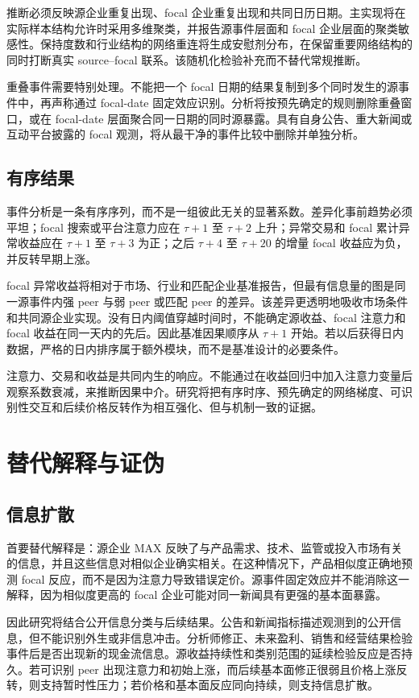 \documentclass[UTF8,a4paper,11pt]{ctexart}
\begin{document}
推断必须反映源企业重复出现、focal 企业重复出现和共同日历日期。主实现将在实际样本结构允许时采用多维聚类，并报告源事件层面和 focal 企业层面的聚类敏感性。保持度数和行业结构的网络重连将生成安慰剂分布，在保留重要网络结构的同时打断真实 source--focal 联系。该随机化检验补充而不替代常规推断。

重叠事件需要特别处理。不能把一个 focal 日期的结果复制到多个同时发生的源事件中，再声称通过 focal-date 固定效应识别。分析将按预先确定的规则删除重叠窗口，或在 focal-date 层面聚合同一日期的同时源暴露。具有自身公告、重大新闻或互动平台披露的 focal 观测，将从最干净的事件比较中删除并单独分析。

\subsection{有序结果}
事件分析是一条有序序列，而不是一组彼此无关的显著系数。差异化事前趋势必须平坦；focal 搜索或平台注意力应在 $\tau+1$ 至 $\tau+2$ 上升；异常交易和 focal 累计异常收益应在 $\tau+1$ 至 $\tau+3$ 为正；之后 $\tau+4$ 至 $\tau+20$ 的增量 focal 收益应为负，并反转早期上涨。

focal 异常收益将相对于市场、行业和匹配企业基准报告，但最有信息量的图是同一源事件内强 peer 与弱 peer 或匹配 peer 的差异。该差异更透明地吸收市场条件和共同源企业实现。没有日内阈值穿越时间时，不能确定源收益、focal 注意力和 focal 收益在同一天内的先后。因此基准因果顺序从 $\tau+1$ 开始。若以后获得日内数据，严格的日内排序属于额外模块，而不是基准设计的必要条件。

注意力、交易和收益是共同内生的响应。不能通过在收益回归中加入注意力变量后观察系数衰减，来推断因果中介。研究将把有序时序、预先确定的网络梯度、可识别性交互和后续价格反转作为相互强化、但与机制一致的证据。

\section{替代解释与证伪}
\subsection{信息扩散}
首要替代解释是：源企业 MAX 反映了与产品需求、技术、监管或投入市场有关的信息，并且这些信息对相似企业确实相关。在这种情况下，产品相似度正确地预测 focal 反应，而不是因为注意力导致错误定价。源事件固定效应并不能消除这一解释，因为相似度更高的 focal 企业可能对同一新闻具有更强的基本面暴露。

因此研究将结合公开信息分类与后续结果。公告和新闻指标描述观测到的公开信息，但不能识别外生或非信息冲击。分析师修正、未来盈利、销售和经营结果检验事件后是否出现新的现金流信息。源收益持续性和类别范围的延续检验反应是否持久。若可识别 peer 出现注意力和初始上涨，而后续基本面修正很弱且价格上涨反转，则支持暂时性压力；若价格和基本面反应同向持续，则支持信息扩散。
\end{document}

